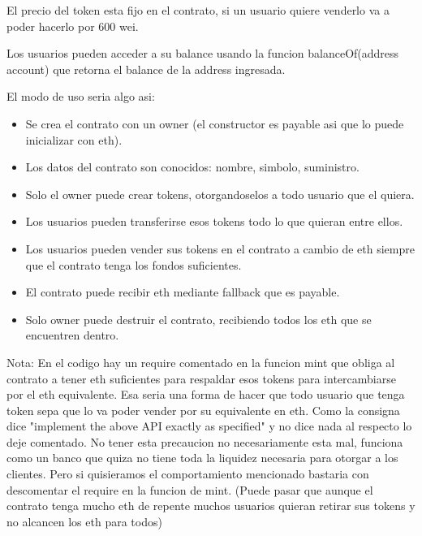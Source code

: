 \documentclass[12pt,addpoints,answers]{exam}
\begin{document}
\begin{questions}
\begin{parts}
\begin{solution}
            El precio del token esta fijo en el contrato, si un usuario quiere venderlo va a poder hacerlo por 600 wei.

            Los usuarios pueden acceder a su balance usando la funcion balanceOf(address account) que retorna el balance
            de la address ingresada.
            
            
            El modo de uso seria algo asi: 
            \begin{itemize}
                \item{Se crea el contrato con un owner (el constructor es payable asi que lo puede inicializar con eth).}
                \item{Los datos del contrato son conocidos: nombre, simbolo, suministro.}
                \item{Solo el owner puede crear tokens, otorgandoselos a todo usuario que el quiera.}
                \item{Los usuarios pueden transferirse esos tokens todo lo que quieran entre ellos.}
                \item{Los usuarios pueden vender sus tokens en el contrato 
                a cambio de eth siempre que el contrato tenga los fondos suficientes.}
                \item{El contrato puede recibir eth mediante fallback que es payable.}
                \item{Solo owner puede destruir el contrato, recibiendo todos los eth que se encuentren dentro.}
            \end{itemize}

            Nota: En el codigo hay un require comentado en la funcion mint que obliga al contrato a tener eth suficientes
            para respaldar esos tokens para intercambiarse por el eth equivalente. Esa seria una forma de hacer que 
            todo usuario que tenga token sepa que lo va poder vender por su equivalente en eth. Como la consigna
            dice "implement the above API exactly as specified" y no dice nada al respecto lo deje comentado. 
            No tener esta precaucion no necesariamente esta mal, funciona como un banco que quiza no tiene toda la liquidez necesaria
            para otorgar a los clientes. Pero si quisieramos el comportamiento mencionado bastaria con descomentar 
            el require en la funcion de mint. (Puede pasar que aunque el contrato tenga mucho eth de repente muchos
            usuarios quieran retirar sus tokens y no alcancen los eth para todos)
    \end{solution}


\end{parts}
\end{questions}
\end{document}
